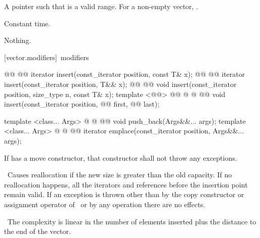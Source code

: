 \documentclass[american,twoside]{book}
\begin{document}
\begin{itemdescr}
\pnum
\returns
A pointer such that  is a valid range. For a
non-empty vector,  \tcode{==} .

\pnum
\complexity
Constant time.

\pnum
\throws
Nothing.
\end{itemdescr}

[vector.modifiers]{\ modifiers}

%
\begin{itemdecl}
@@ @@
  iterator insert(const_iterator position, const T& x);
@@ @@
  iterator insert(const_iterator position, T&& x);
@@ @@
  void insert(const_iterator position, size_type n, const T& x);
template <@@>
    @@
          @ @ @@
    void insert(const_iterator position,
                @@ first, @@ last);

template <class... Args> 
  @ @
        @@
  void push_back(Args&&... args);
template <class... Args> 
  @ @
        @@
  iterator emplace(const_iterator position, Args&&... args);
\end{itemdecl}

\begin{itemdescr}
\pnum
\requires If  has a move constructor, that
constructor shall not throw any exceptions.

\pnum
\notes\ 
Causes reallocation if the new size is greater than the old capacity.
If no reallocation happens, all the iterators and references before the insertion point remain valid.
If an exception is thrown other than by
the copy constructor or assignment operator of
\ or by any  operation
there are no effects.

\pnum
\complexity\ 
The complexity is linear in the number of elements inserted plus the distance
to the end of the vector.
\end{itemdescr}
\end{document}
